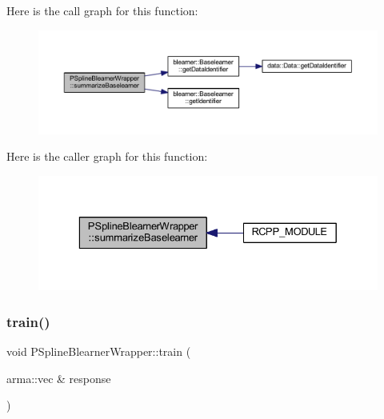 Here is the call graph for this function\+:
\nopagebreak
\begin{figure}[H]
\begin{center}
\leavevmode
\includegraphics[width=350pt]{class_p_spline_blearner_wrapper_a7796ee928de438649ede7aa1aa57263a_cgraph}
\end{center}
\end{figure}
Here is the caller graph for this function\+:
\nopagebreak
\begin{figure}[H]
\begin{center}
\leavevmode
\includegraphics[width=329pt]{class_p_spline_blearner_wrapper_a7796ee928de438649ede7aa1aa57263a_icgraph}
\end{center}
\end{figure}
\mbox{\label{class_p_spline_blearner_wrapper_a10193fd93f82c2c333e704d7cb67dd27}} 
\subsubsection{\texorpdfstring{train()}{train()}}
{\footnotesize\ttfamily void P\+Spline\+Blearner\+Wrapper\+::train (\begin{DoxyParamCaption}\item[{arma\+::vec \&}]{response }\end{DoxyParamCaption})\hspace{0.3cm}{\ttfamily [inline]}}

